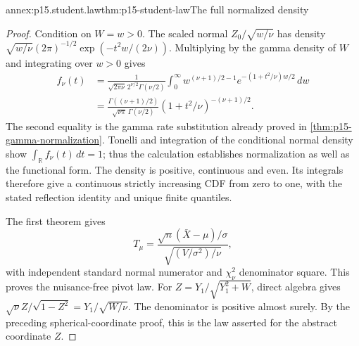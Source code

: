 \begin{annexitem}{annex:p15.student.law}{thm:p15-student-law}{The full normalized density}
\begin{proof}
Condition on \(W=w>0\). The scaled normal
\(Z_0/\sqrt{w/\nu}\) has density
\(\sqrt{w/\nu}(2\pi)^{-1/2}
 \exp(-t^2w/(2\nu))\).
Multiplying by the gamma density of \(W\) and integrating
over \(w>0\) gives
\[
\begin{split}
 f_\nu(t)
 &=\frac{1}{\sqrt{2\pi\nu}\,2^{\nu/2}\Gamma(\nu/2)}
   \int_0^\infty
       w^{(\nu+1)/2-1}
       e^{-(1+t^2/\nu)w/2}\,dw\\
 &=\frac{\Gamma((\nu+1)/2)}
          {\sqrt{\nu\pi}\,\Gamma(\nu/2)}
       (1+t^2/\nu)^{-(\nu+1)/2}.
\end{split}
\]
The second equality is the gamma rate substitution
already proved in \cref{thm:p15-gamma-normalization}.
Tonelli and integration of the conditional normal
density show \(\int_{\mathbb R}f_\nu(t)\,dt=1\);
thus the calculation establishes normalization as well
as the functional form.
The density is positive, continuous and even. Its
integrals therefore give a continuous strictly
increasing CDF from zero to one, with the stated
reflection identity and unique finite quantiles.

The first theorem gives
\[
 T_\mu=\frac{\sqrt n(\bar X-\mu)/\sigma}
                 {\sqrt{(V/\sigma^2)/\nu}},
\]
with independent standard normal numerator and
\(\chi_\nu^2\) denominator square. This proves the
nuisance-free pivot law.
For \(Z=Y_1/\sqrt{Y_1^2+W}\), direct algebra gives
\(\sqrt\nu Z/\sqrt{1-Z^2}=Y_1/\sqrt{W/\nu}\).
The denominator is positive almost surely.
By the preceding spherical-coordinate proof, this
is the law asserted for the abstract coordinate \(Z\).
\end{proof}
\end{annexitem}

